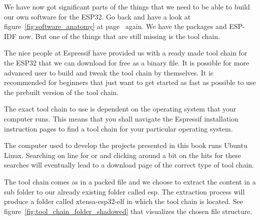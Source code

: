 \documentclass{tufte-book}
\begin{document}

We have now got significant parts of the things that we need to be able to build our own software for the ESP32. Go back and have a look at figure~\ref{fig:software_anatomy} at page~\pageref{fig:software_anatomy} again. We have the packages and ESP-IDF now. But one of the things that are still missing is the tool chain.

The nice people at Espressif have provided us with a ready made tool chain for the ESP32 that we can download for free as a binary file. It is possible for more advanced user to build and tweak the tool chain by themselves. It is recommended for beginners that just want to get started as fast as possible to use the prebuilt version of the tool chain.

The exact tool chain to use is dependent on the operating system that your computer runs. This means that you shall navigate the Espressif installation instruction pages to find a tool chain for your particular operating system.


The computer used to develop the projects presented in this book runs Ubuntu Linux. Searching on line for  or  and clicking around a bit on the hits for these searches will eventually lead to a download page of the correct type of tool chain.

The tool chain comes as in a packed file and we choose to extract the content in a sub folder to our already existing folder called esp. The extraction process will produce a folder called xtensa-esp32-elf in which the tool chain is located. See figure~\ref{fig:tool_chain_folder_shadowed} that visualizes the chosen file structure.
\end{document}
